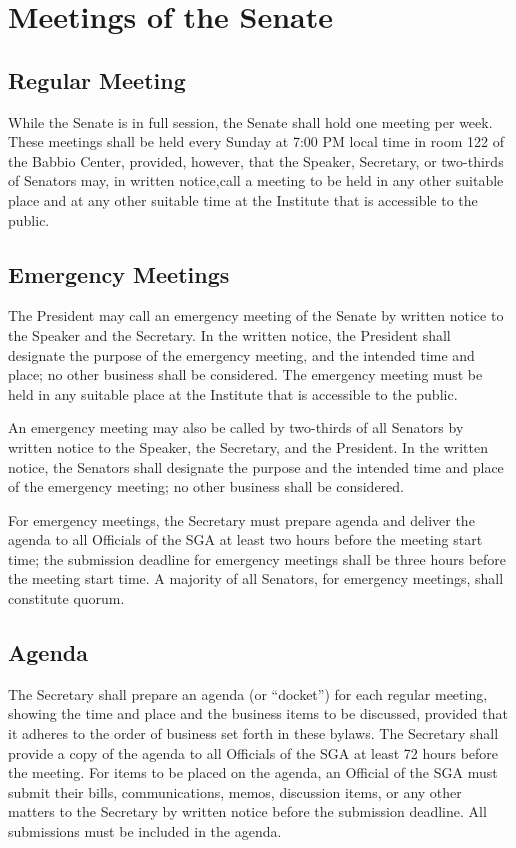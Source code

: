 \documentclass[12pt]{scrreprt}
\begin{document}
\section{Meetings of the Senate}

\subsection{Regular Meeting}
While the Senate is in full session, the Senate shall hold one meeting per week. These meetings shall be held every Sunday at 7:00 PM local time in room 122 of the Babbio Center, provided, however, that the Speaker, Secretary, or two-thirds of Senators may, in written notice,call a meeting to be held in any other suitable place and at any other suitable time at the Institute that is accessible to the public.
 
\subsection{Emergency Meetings}
The President may call an emergency meeting of the Senate by written notice to the Speaker and the Secretary. In the written notice, the President shall designate the purpose of the emergency meeting, and the intended time and place; no other business shall be considered. The emergency meeting must be held in any suitable place at the Institute that is accessible to the public.

An emergency meeting may also be called by two-thirds of all Senators by written notice to the Speaker, the Secretary, and the President. In the written notice, the Senators shall designate the purpose and the intended time and place of the emergency meeting; no other business shall be considered.

For emergency meetings, the Secretary must prepare agenda and deliver the agenda to all Officials of the SGA at least two hours before the meeting start time; the submission deadline
for emergency meetings shall be three hours before the meeting start time. A majority of all Senators, for emergency meetings, shall constitute quorum.

\subsection{Agenda}
The Secretary shall prepare an agenda (or “docket”) for each regular meeting, showing the time
and place and the business items to be discussed, provided that it adheres to the order of
business set forth in these bylaws. The Secretary shall provide a copy of the agenda to all
Officials of the SGA at least 72 hours before the meeting. For items to be placed on the agenda,
an Official of the SGA must submit their bills, communications, memos, discussion items, or any
other matters to the Secretary by written notice before the submission deadline. All submissions
must be included in the agenda.
\end{document}
